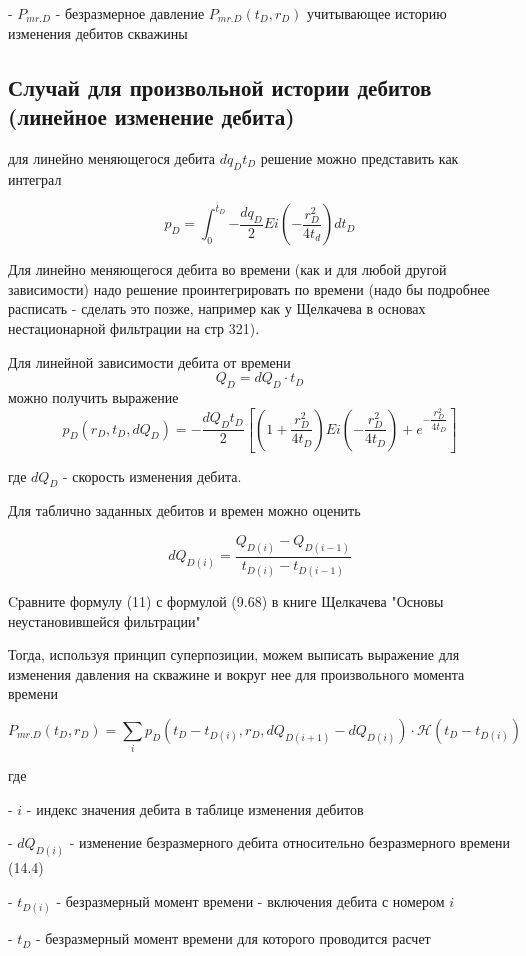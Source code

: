 \documentclass[oneside, openany]{memoir}
\begin{document}
	- $P_{mr.D} $ - безразмерное давление $P_{mr.D}(t_D, r_D)$ учитывающее историю изменения дебитов скважины
	
	\subsection{Случай для произвольной истории дебитов (линейное изменение дебита)}
	
	для линейно меняющегося дебита $dq_D t_D$ решение можно представить как интеграл
	
	$$
	p_D = \int_0^{t_D}{- \frac{dq_D}{2} Ei \left(- \dfrac{ r_D^2}{4t_d} \right) dt_D}
	$$
	
	
	
	Для линейно меняющегося дебита во времени (как и для любой другой зависимости) надо решение проинтегрировать по времени (надо бы подробнее расписать - сделать это позже, например как у Щелкачева в основах нестационарной фильтрации на стр 321).
	
	Для линейной зависимости дебита от времени 
	$$
	Q_D = dQ_D \cdot t_D 
	$$
	можно получить выражение
	$$
	p_D(r_D,t_D, dQ_D) =-\frac{dQ_D t_D }{2} \left[ \left( 1+ \frac{r_D^2}{4 t_D} \right) Ei \left(- \dfrac{r_D^2}{4t_D} \right) + e^{-\dfrac{r_D^2}{4t_D}} \right] $$ 
	
	где $dQ_D$ - скорость изменения дебита.
	
	Для таблично заданных дебитов и времен можно оценить 
	
	$$
	dQ_{D(i)} = \dfrac{Q_{D(i)}-Q_{D(i-1)}}{t_{D(i)} - t_{D(i-1)} } 
	$$
	
	Cравните формулу (11) с формулой (9.68) в книге Щелкачева "Основы неустановившейся фильтрации"
	
	Тогда, используя принцип суперпозиции, можем выписать выражение для изменения давления на скважине и вокруг нее для произвольного момента времени
	
	$$P_{mr.D}(t_D, r_D) = \sum_i  p_D\left(t_D-t_{D(i)}, r_D, dQ_{D(i+1)} - dQ_{D(i)}\right)\cdot \mathcal{H}(t_D-t_{D(i)}) $$
	
	где
	
	- $i$ - индекс значения дебита в таблице изменения дебитов
	
	- $dQ_{D(i)}$ - изменение безразмерного дебита относительно безразмерного времени (14.4) 
	
	- $t_{D(i)}$ - безразмерный момент времени - включения дебита с номером $i$
	
	- $t_{D}$ - безразмерный момент времени для которого проводится расчет
	
\end{document}
